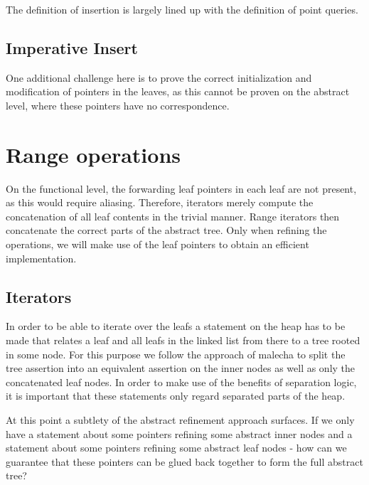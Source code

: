 \documentclass[a4paper,UKenglish,cleveref, autoref, thm-restate]{lipics-v2021}
\begin{document}
The definition of insertion is largely lined up with the definition
of point queries.

\subsection{Imperative Insert}
\label{sec:imperative_insert}

One additional challenge here is to prove the correct initialization
and modification of pointers in the leaves,
as this cannot be proven on the abstract level, where these pointers
have no correspondence.


\section{Range operations}
\label{sec:range}

On the functional level, the forwarding leaf pointers in each leaf
are not present, as this would require aliasing.
Therefore, iterators merely compute the concatenation
of all leaf contents in the trivial manner.
Range iterators then concatenate the correct parts of the
abstract tree.
Only when refining the operations, we will make use of the leaf pointers
to obtain an efficient implementation.

\subsection{Iterators}
\label{sec:imperative_iter}

In order to be able to iterate over the leafs
a statement on the heap has to be made that relates
a leaf and all leafs in the linked list from there
to a tree rooted in some node.
For this purpose we follow the approach of malecha
to split the tree assertion into an equivalent assertion
on the inner nodes as well as only the concatenated leaf nodes.
In order to make use of the benefits of separation logic,
it is important that these statements only regard separated parts of the heap.

At this point a subtlety of the abstract refinement approach surfaces.
If we only have a statement about some pointers refining some abstract inner nodes
and a statement about some pointers refining some abstract leaf nodes - 
how can we guarantee that these pointers can be glued back together to form the
full abstract tree?
\end{document}
